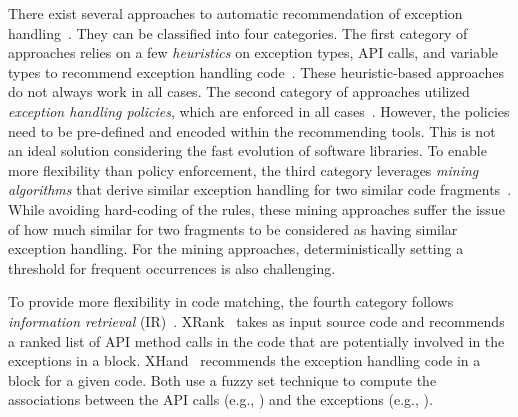 There exist several approaches to automatic recommendation of
exception
handling~\cite{barbosa-bsse12,chanchal-scam14,barbosa-tse18,barbosa-tse16,xrank-fse20,throw-ase22}. They
can be classified into four categories. The first category of
approaches relies on a few {\em heuristics} on exception types, API
calls, and variable types to recommend exception handling
code~\cite{barbosa-bsse12}. These heuristic-based approaches do not
always work in all cases. The second category of approaches
utilized {\em exception handling policies}, which are enforced in all
cases~\cite{barbosa-tse16,barbosa-saner18}. However, the policies need
to be pre-defined and encoded within the recommending tools.  This is not
an ideal solution considering the fast evolution of software
libraries. To enable more flexibility than policy enforcement, the
third category leverages {\em mining algorithms} that derive
similar exception handling for two similar code
fragments~\cite{chanchal-scam14}. While avoiding hard-coding of
the rules, these mining approaches suffer the issue of how much similar
for two fragments to be considered as having similar exception
handling. For the mining approaches, deterministically setting a
threshold for frequent occurrences is also challenging.

To provide more flexibility in code matching, the fourth category
follows {\em information retrieval}
(IR)~\cite{xrank-fse20}. XRank~\cite{xrank-fse20} takes as input
source code and recommends a ranked list of API method calls in the
code that are potentially involved in the exceptions in a 
block. XHand~\cite{xrank-fse20} recommends the exception handling
code in a  block for a given code. Both use a fuzzy set
technique to compute the associations between the API calls (e.g.,
) and the exceptions (e.g.,
).

